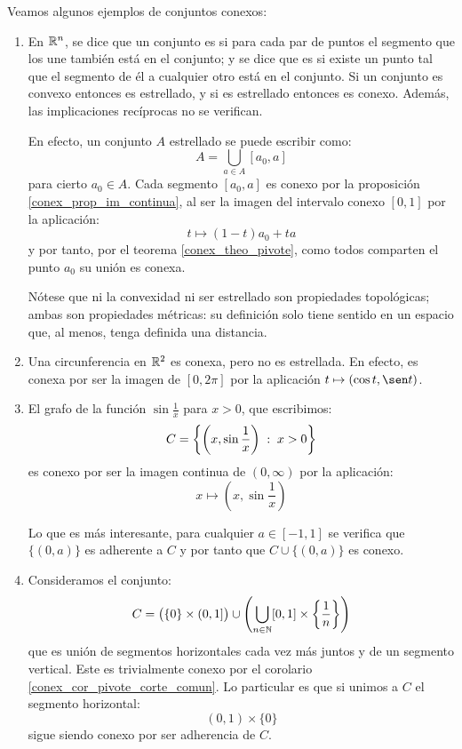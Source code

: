 \begin{exa} Veamos algunos ejemplos de conjuntos conexos:
	\begin{enumerate}
		\item En $\mathbb{R}^n$, se dice que un conjunto es  si para cada par de puntos el segmento que los une también está en el conjunto; y se dice que es  si existe un punto tal que el segmento de él a cualquier otro está en el conjunto. Si un conjunto es convexo entonces es estrellado, y si es estrellado entonces es conexo. Además, las implicaciones recíprocas no se verifican.
		
		En efecto, un conjunto $A$ estrellado se puede escribir como:
		\[A=\bigcup_{a\in A} [a_0, a]\]
		para cierto $a_0\in A$. Cada segmento $[a_0,a]$ es conexo por la proposición \ref{conex_prop_im_continua}, al ser la imagen del intervalo conexo $[0,1]$ por la aplicación:
		\[t\mapsto (1-t)a_0+ta\]
		y por tanto, por el teorema \ref{conex_theo_pivote}, como todos comparten el punto $a_0$ su unión es conexa.
		
		Nótese que ni la convexidad ni ser estrellado son propiedades topológicas; ambas son propiedades métricas: su definición solo tiene sentido en un espacio que, al menos, tenga definida una distancia.
		
		\item Una circunferencia en $\mathbb{R}^2$ es conexa, pero no es estrellada. En efecto, es conexa por ser la imagen de $[0,2\pi]$ por la aplicación $t\mapsto (\cos t, \sen t)$.
		
		\item El grafo de la función $\sin\frac{1}{x}$ para $x>0$, que escribimos:
		\[C = \left\{\left(x,\sin\frac{1}{x}\right)\;:\; x>0\right\}\]
		es conexo por ser la imagen continua de $(0,\infty)$ por la aplicación:
		\[x\mapsto \left(x,\sin\frac{1}{x}\right)\]
		
		Lo que es más interesante, para cualquier $a\in [-1,1]$ se verifica que $\{(0,a)\}$ es adherente a $C$ y por tanto que $C\cup\{(0,a)\}$ es conexo.
		
		\item Consideramos el conjunto:
		\[C = \big(\{0\}\times (0,1]\big) \cup \left(\bigcup_{n\in\mathbb{N}} [0,1]\times\left\{\frac{1}{n}\right\}\right) \]
		que es unión de segmentos horizontales cada vez más juntos y de un segmento vertical. Este es trivialmente conexo por el corolario \ref{conex_cor_pivote_corte_comun}. Lo particular es que si unimos a $C$ el segmento horizontal:
		\[(0,1)\times\{0\}\]
		sigue siendo conexo por ser adherencia de $C$. \qedhere
	\end{enumerate}
\end{exa}

